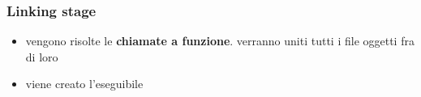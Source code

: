 \subsubsection{Linking stage}
    \begin{itemize}
        \item vengono risolte le \textbf{chiamate a funzione}. verranno uniti tutti i file oggetti fra di loro
        \item viene creato l’eseguibile
    \end{itemize}